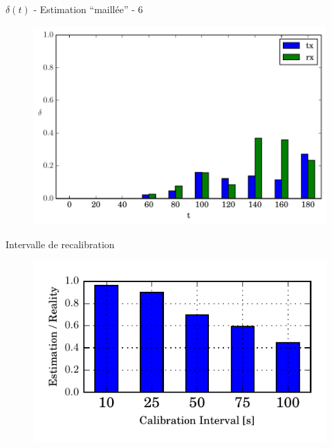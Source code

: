 \begin{frame}{$\delta(t)$ - Estimation ``maillée'' - 6}
  \begin{figure}
    \centering  
    \includegraphics[width=\textwidth]{figures/evolution_route_6.pdf}
  \end{figure}
\end{frame}

\begin{frame}{Intervalle de recalibration}
  \begin{figure}[ht]
    \centering
    \includegraphics[width=\textwidth]{figures/ratio_recalibration.pdf}
  \end{figure}
\end{frame}




